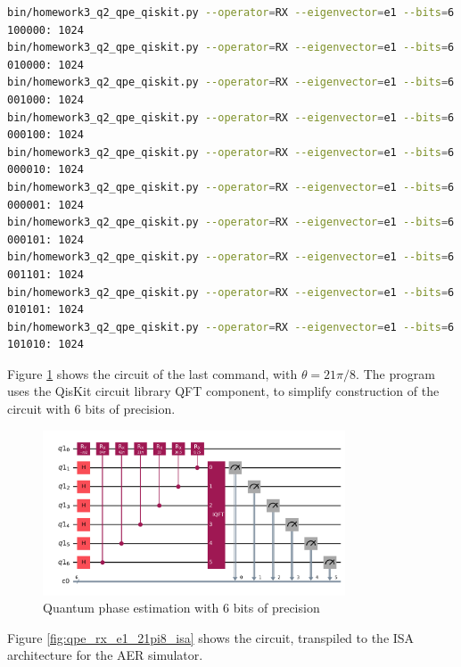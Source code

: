 \documentclass[12pt]{extarticle}
\begin{document}
\begin{lstlisting}[language=bash,basicstyle=\tiny]
bin/homework3_q2_qpe_qiskit.py --operator=RX --eigenvector=e1 --bits=6 --theta="2*pi"
100000: 1024
bin/homework3_q2_qpe_qiskit.py --operator=RX --eigenvector=e1 --bits=6 --theta="pi"
010000: 1024
bin/homework3_q2_qpe_qiskit.py --operator=RX --eigenvector=e1 --bits=6 --theta="pi/2"
001000: 1024
bin/homework3_q2_qpe_qiskit.py --operator=RX --eigenvector=e1 --bits=6 --theta="pi/4"
000100: 1024
bin/homework3_q2_qpe_qiskit.py --operator=RX --eigenvector=e1 --bits=6 --theta="pi/8"
000010: 1024
bin/homework3_q2_qpe_qiskit.py --operator=RX --eigenvector=e1 --bits=6 --theta="pi/16"
000001: 1024
bin/homework3_q2_qpe_qiskit.py --operator=RX --eigenvector=e1 --bits=6 --theta="5*pi/16"
000101: 1024
bin/homework3_q2_qpe_qiskit.py --operator=RX --eigenvector=e1 --bits=6 --theta="13*pi/16"
001101: 1024
bin/homework3_q2_qpe_qiskit.py --operator=RX --eigenvector=e1 --bits=6 --theta="21*pi/16"
010101: 1024
bin/homework3_q2_qpe_qiskit.py --operator=RX --eigenvector=e1 --bits=6 --theta="21*pi/8"
101010: 1024
\end{lstlisting}

Figure \ref{fig:qpe_rx_e1_21pi8} shows the circuit of the last command, with $\theta=21\pi/8$.
The program uses the QisKit circuit library QFT component, to simplify construction of the circuit with 6 bits of precision.

\begin{figure}[H]
\centering
\includegraphics[width=0.80\textwidth]{images/homework3_q2_qpe_rx_e1_21pi8.png}
\caption{Quantum phase estimation with 6 bits of precision}
\label{fig:qpe_rx_e1_21pi8}
\end{figure}

Figure \ref{fig:qpe_rx_e1_21pi8_isa} shows the circuit, transpiled to the ISA architecture for the AER simulator.
\end{document}
